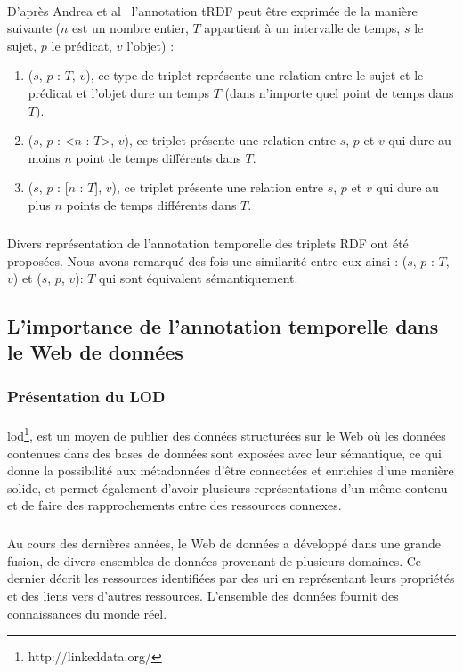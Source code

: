 \documentclass[12pt,a4]{report}
\begin{document}
\paragraph{}
D'après Andrea et al~\cite{pugliese2008} l’annotation tRDF peut être exprimée de la manière suivante ($n$ est un nombre entier, $T$ appartient à un intervalle de temps, $s$ le sujet, $p$ le prédicat, $v$ l'objet) :
\begin{enumerate}
\item ($s$, $p$ : {$T$}, $v$), ce type de triplet représente une relation entre le sujet et le prédicat et l'objet dure un temps $T$ (dans n'importe quel point de temps dans $T$).
\item ($s$, $p$ : <$n$ : $T$>, $v$), ce triplet présente une relation entre $s$, $p$ et $v$ qui dure au moins $n$ point de temps différents dans $T$.
\item ($s$, $p$ : [$n$ : $T$], $v$), ce triplet présente une relation entre $s$, $p$ et $v$ qui dure au plus $n$ points de temps différents dans $T$.
\end{enumerate}
\subparagraph{}
Divers représentation de l'annotation temporelle des triplets RDF ont été proposées. Nous avons remarqué des fois une similarité entre eux ainsi : ($s$, $p$ : {$T$}, $v$) et ($s$, $p$, $v$): $T$ qui sont équivalent sémantiquement.	
\subsection{L'importance de l'annotation temporelle dans le Web de données}
\subsubsection{Présentation du LOD}
\paragraph{}
\gls{lod}\footnote{http://linkeddata.org/}, est un moyen de publier des données structurées sur le Web où les données contenues dans des bases de données sont exposées avec leur sémantique, ce qui donne la possibilité aux métadonnées d'être connectées et enrichies d'une manière solide, et permet également d'avoir plusieurs représentations d'un même contenu et de faire des rapprochements entre des ressources connexes.
\subparagraph{}
Au cours des dernières années, le Web de données a développé dans une grande fusion, de divers ensembles de données provenant de plusieurs domaines. Ce dernier décrit les ressources identifiées par des \gls{uri} en représentant leurs propriétés et des liens vers d’autres ressources. L'ensemble des données fournit des connaissances du monde réel.
\end{document}
